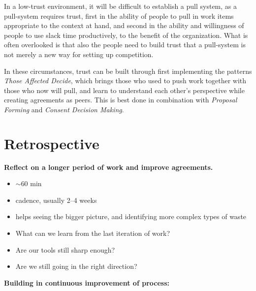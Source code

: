 In a low-trust environment, it will be difficult to establish a pull system, as a pull-system requires trust, first in the ability of people to pull in work items appropriate to the context at hand, and second in the ability and willingness of people to use slack time productively, to the benefit of the organization. What is often overlooked is that also the people need to build trust that a pull-system is not merely a new way for setting up competition.

In these circumstances, trust can be built through first implementing the patterns \emph{Those Affected Decide}, which brings those who used to push work together with those who now will pull, and learn to understand each other's perspective while creating agreements as peers. This is best done in combination with \emph{Proposal Forming} and \emph{Consent Decision Making}.

\section{Retrospective}
\label{retrospective}

\textbf{Reflect on a longer period of work and improve agreements.}

\begin{itemize}
\item \ensuremath{\sim}60 min

\item cadence, usually 2--4 weeks

\item helps seeing the bigger picture, and identifying more complex types of waste

\item What can we learn from the last iteration of work?

\item Are our tools still sharp enough?

\item Are we still going in the right direction?

\end{itemize}

\textbf{Building in continuous improvement of process:}

